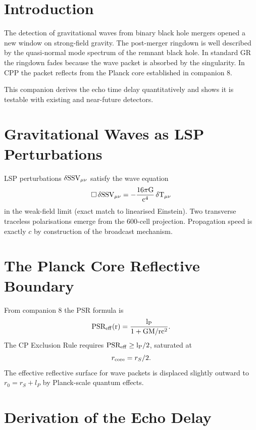 \documentclass[12pt]{article}
\newcommand{\PSR}{\rm PSR}
\newcommand{\SSV}{\rm SSV}
\begin{document}
\section{Introduction}

The detection of gravitational waves from binary black hole mergers opened a new window on strong-field gravity. The post-merger ringdown is well described by the quasi-normal mode spectrum of the remnant black hole. In standard GR the ringdown fades because the wave packet is absorbed by the singularity. In CPP the packet reflects from the Planck core established in companion 8.

This companion derives the echo time delay quantitatively and shows it is testable with existing and near-future detectors.

\section{Gravitational Waves as LSP Perturbations}

LSP perturbations \(\delta\SSV_{\mu\nu}\) satisfy the wave equation
\[
\Box\,\delta\SSV_{\mu\nu} = -\frac{16\pi G}{c^4}\,\delta T_{\mu\nu}
\]
in the weak-field limit (exact match to linearised Einstein). Two transverse traceless polarisations emerge from the 600-cell projection. Propagation speed is exactly \(c\) by construction of the broadcast mechanism.

\section{The Planck Core Reflective Boundary}

From companion 8 the PSR formula is
\[
\PSR_{\rm eff}(r) = \frac{l_P}{1 + GM/rc^2}.
\]
The CP Exclusion Rule requires \(\PSR_{\rm eff} \ge l_P/2\), saturated at
\[
r_{\rm core} = r_S/2.
\]
The effective reflective surface for wave packets is displaced slightly outward to \(r_0 = r_S + l_P\) by Planck-scale quantum effects.

\section{Derivation of the Echo Delay}
\end{document}
